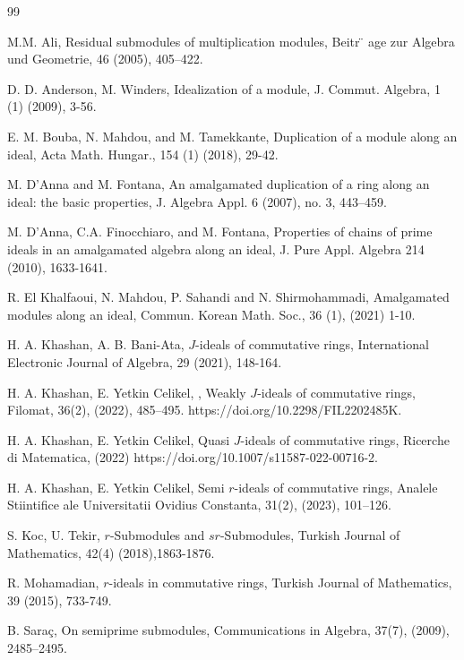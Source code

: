 \documentclass{amsart}%
\providecommand{\U}[1]{\protect\rule{.1in}{.1in}}
\theoremstyle{plain}
\numberwithin{equation}{section}
\begin{document}
\begin{thebibliography}{99}                                                                                               %


M.M. Ali, Residual submodules of multiplication modules, Beitr%
\"{}%
age zur Algebra und Geometrie, 46 (2005), 405--422.

D. D. Anderson, M. Winders, Idealization of a module, J.
Commut. Algebra, 1 (1) (2009), 3-56.

E. M. Bouba, N. Mahdou, and M. Tamekkante, Duplication of a
module along an ideal, Acta Math. Hungar., 154 (1) (2018), 29-42.

M. D'Anna and M. Fontana, An amalgamated duplication of a
ring along an ideal: the basic properties, J. Algebra Appl. 6 (2007), no. 3, 443--459.

M. D'Anna, C.A. Finocchiaro, and M. Fontana, Properties of
chains of prime ideals in an amalgamated algebra along an ideal, J. Pure Appl.
Algebra 214 (2010), 1633-1641.

R. El Khalfaoui, N. Mahdou, P. Sahandi and N. Shirmohammadi,
Amalgamated modules along an ideal, Commun. Korean Math. Soc., 36 (1), (2021) 1-10.

H. A. Khashan, A. B. Bani-Ata, $J$-ideals of commutative rings,
International Electronic Journal of Algebra, 29 (2021), 148-164.

H. A. Khashan, E. Yetkin Celikel, , Weakly $J$-ideals of
commutative rings, Filomat, 36(2), (2022), 485--495. https://doi.org/10.2298/FIL2202485K.

H. A. Khashan, E. Yetkin Celikel, Quasi $J$-ideals of
commutative rings, Ricerche di Matematica, (2022) https://doi.org/10.1007/s11587-022-00716-2.

H. A. Khashan, E. Yetkin Celikel, Semi $r$-ideals of commutative
rings, Analele Stiintifice ale Universitatii Ovidius Constanta, 31(2), (2023), 101--126.

S. Koc, U. Tekir, $r$-Submodules and $sr$-Submodules, Turkish
Journal of Mathematics, 42(4) (2018),1863-1876.

R. Mohamadian, $r$-ideals in commutative rings, Turkish Journal
of Mathematics, 39 (2015), 733-749.

B. Sara\c{c}, On semiprime submodules, Communications in
Algebra, 37(7), (2009), 2485--2495.


\end{thebibliography}
\end{document}
